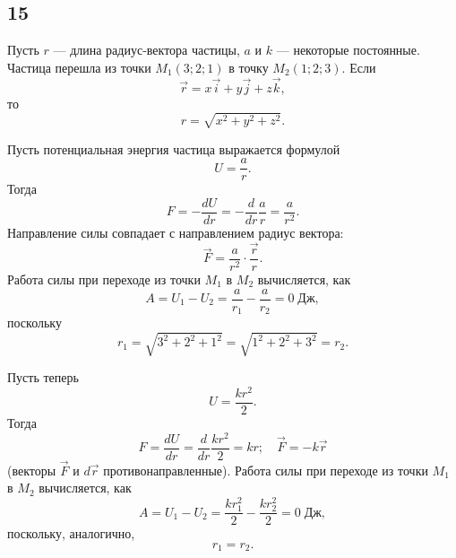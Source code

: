 \subsection{15}

Пусть $r$ --- длина радиус-вектора частицы, $a$ и $k$ --- некоторые постоянные. Частица перешла из точки $M_1(3;2;1)$ в точку $M_2(1;2;3)$. Если
\[
\vec r=x\vec i+y\vec j+z\vec k,
\]
то
\[
r=\sqrt{x^2+y^2+z^2}.
\]

Пусть потенциальная энергия частица выражается формулой
\[
U=\frac{a}{r}.
\]
Тогда
\[
F=-\frac{dU}{dr}=-\frac{d}{dr}\frac{a}{r}=\frac{a}{r^2}.
\]
Направление силы совпадает с направлением радиус вектора:
\[
\vec F=\frac{a}{r^2}\cdot\frac{\vec r}{r}.
\]
Работа силы при переходе из точки $M_1$ в $M_2$ вычисляется, как
\[
A=U_1-U_2=\frac{a}{r_1}-\frac{a}{r_2}=0\;\text{Дж},
\]
поскольку
\[
r_1=\sqrt{3^2+2^2+1^2}=\sqrt{1^2+2^2+3^2}=r_2.
\]

Пусть теперь
\[
U=\frac{kr^2}{2}.
\]
Тогда
\[
F=\frac{dU}{dr}=\frac{d}{dr}\frac{kr^2}{2}=kr;\quad \vec F=-k\vec r
\]
(векторы $\vec F$ и $d\vec r$ противонаправленные).
Работа силы при переходе из точки $M_1$ в $M_2$ вычисляется, как
\[
A=U_1-U_2=\frac{kr_1^2}{2}-\frac{kr_2^2}{2}=0\;\text{Дж},
\]
поскольку, аналогично,
\[
r_1=r_2.
\]